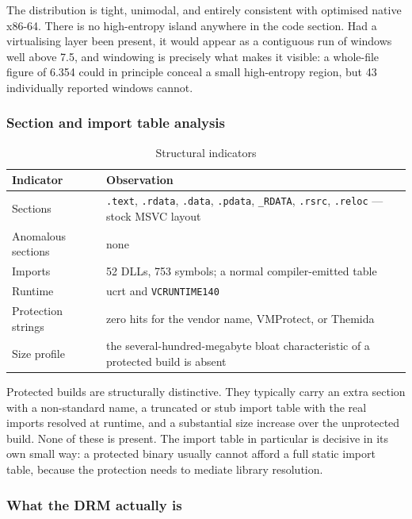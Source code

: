 The distribution is tight, unimodal, and entirely consistent with optimised
native x86-64. There is no high-entropy island anywhere in the code section. Had
a virtualising layer been present, it would appear as a contiguous run of windows
well above 7.5, and windowing is precisely what makes it visible: a whole-file
figure of 6.354 could in principle conceal a small high-entropy region, but 43
individually reported windows cannot.

\subsubsection{Section and import table analysis}

\begin{table}[htbp]
\caption{Structural indicators}
\label{tab:pe}
\centering
\footnotesize
\begin{tabularx}{\columnwidth}{@{}L{3.0cm}X@{}}
\toprule
\textbf{Indicator} & \textbf{Observation} \\
\midrule
Sections & \verb|.text|, \verb|.rdata|, \verb|.data|, \verb|.pdata|,
            \verb|_RDATA|, \verb|.rsrc|, \verb|.reloc| --- stock MSVC layout \\
Anomalous sections & none \\
Imports & 52 DLLs, 753 symbols; a normal compiler-emitted table \\
Runtime & ucrt and \verb|VCRUNTIME140| \\
Protection strings & zero hits for the vendor name, VMProtect, or Themida \\
Size profile & the several-hundred-megabyte bloat characteristic of a protected
               build is absent \\
\bottomrule
\end{tabularx}
\end{table}

Protected builds are structurally distinctive. They typically carry an extra
section with a non-standard name, a truncated or stub import table with the real
imports resolved at runtime, and a substantial size increase over the unprotected
build. None of these is present. The import table in particular is decisive in
its own small way: a protected binary usually cannot afford a full static import
table, because the protection needs to mediate library resolution.

\subsubsection{What the DRM actually is}


